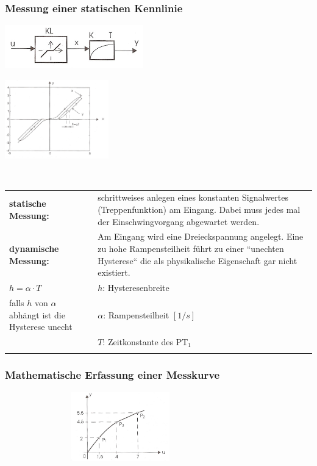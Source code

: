 	\subsubsection{Messung einer statischen Kennlinie }
	\begin{minipage}{10cm}
		\includegraphics[width=6cm]{./bilder/NichtlinearMitPT1.jpg}   
    \end{minipage}
	\begin{minipage}{7cm}
    	\includegraphics[width=4.5cm]{./bilder/NichtlinearMitPT1_dia.jpg}
    \end{minipage}\\
		\begin{tabular}{p{4cm}  p{14cm}}
				\textbf{statische Messung:} &
				schrittweises anlegen eines konstanten Signalwertes (Treppenfunktion)
				am Eingang. Dabei muss jedes mal der Einschwingvorgang abgewartet werden.\\
				
				\textbf{dynamische Messung:} &
				Am Eingang wird eine Dreieckspannung angelegt. Eine zu hohe Rampensteilheit
				führt zu einer ``unechten Hysterese`` die als physikalische Eigenschaft gar
				nicht existiert.\\
		
				$h = \alpha \cdot T$ & $h$: Hysteresenbreite\\
				\parbox{4cm}{falls $h$ von $\alpha$ abhängt ist die Hysterese unecht} & $\alpha$: Rampensteilheit $[1/s]$\\
				& $T$: Zeitkonstante des PT$_1$\\
				& 
			
		\end{tabular}


	\subsubsection{Mathematische Erfassung einer Messkurve }
	\begin{floatingfigure}[r]{12cm}
    \includegraphics[width=10cm,height=3cm]{./bilder/KennlinieMitStuetzwerten.jpg}
	\end{floatingfigure}
   	
